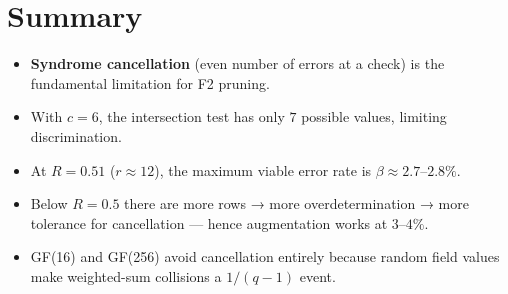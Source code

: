 \documentclass[11pt]{article}
\begin{document}
\section{Summary}

\begin{itemize}
  \item \textbf{Syndrome cancellation} (even number of errors at a check)
        is the fundamental limitation for F2 pruning.
  \item With $c=6$, the intersection test has only $7$ possible values,
        limiting discrimination.
  \item At $R=0.51$ ($r\approx12$), the maximum viable error rate is
        $\beta\approx 2.7$--$2.8\%$.
  \item Below $R=0.5$ there are more rows → more overdetermination →
        more tolerance for cancellation — hence augmentation works at
        $3$--$4\%$.
  \item GF(16) and GF(256) avoid cancellation entirely because random
        field values make weighted-sum collisions a $1/(q-1)$ event.
\end{itemize}
\end{document}
